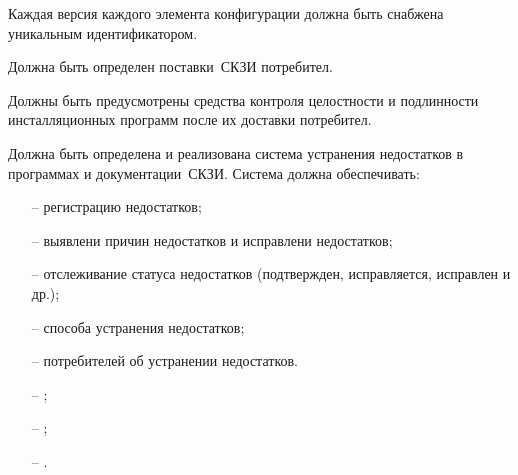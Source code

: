 \label{R.LC.CMVersion}
Каждая версия каждого элемента конфигурации 
должна быть снабжена уникальным идентификатором. 

\label{R.LC.Delivery}
Должна быть определен  поставки~СКЗИ потребител.  

\label{R.LC.Authenticode}
Должны быть предусмотрены средства контроля целостности и подлинности 
инсталляционных программ после их доставки потребител. 

\label{R.LC.FlawRemediation}
Должна быть определена и реализована система устранения недостатков в программах
и документации~СКЗИ.
%
Система должна обеспечивать:
\begin{itemize}
\item[--]
регистрацию недостатков;
\item[--]
 выявлени причин недостатков
и исправлени недостатков;
\item[--]
отслеживание статуса недостатков 
(подтвержден, исправляется, исправлен и др.);
\item[--]
 способа устранения недостатков;
\item[--]
 потребителей об устранении недостатков.
\end{itemize}

\label{R.LC.SU}
\begin{itemize}
\item[--]
;
\item[--]
;  
\item[--]
.
\end{itemize}

